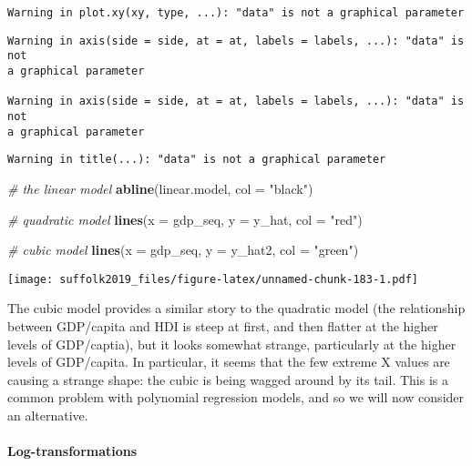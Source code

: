 \documentclass[]{article}
\newenvironment{Shaded}{\begin{snugshade}}{\end{snugshade}}
\newcommand{\CommentTok}[1]{\textcolor[rgb]{0.56,0.35,0.01}{\textit{#1}}}
\newcommand{\DataTypeTok}[1]{\textcolor[rgb]{0.13,0.29,0.53}{#1}}
\newcommand{\KeywordTok}[1]{\textcolor[rgb]{0.13,0.29,0.53}{\textbf{#1}}}
\newcommand{\NormalTok}[1]{#1}
\newcommand{\StringTok}[1]{\textcolor[rgb]{0.31,0.60,0.02}{#1}}
\let\oldparagraph\paragraph
\renewcommand{\paragraph}[1]{\oldparagraph{#1}\mbox{}}
\begin{document}
\begin{verbatim}
Warning in plot.xy(xy, type, ...): "data" is not a graphical parameter
\end{verbatim}

\begin{verbatim}
Warning in axis(side = side, at = at, labels = labels, ...): "data" is not
a graphical parameter

Warning in axis(side = side, at = at, labels = labels, ...): "data" is not
a graphical parameter
\end{verbatim}

\begin{verbatim}
Warning in title(...): "data" is not a graphical parameter
\end{verbatim}

\begin{Shaded}
\begin{Highlighting}[]
\CommentTok{# the linear model}
\KeywordTok{abline}\NormalTok{(linear.model, }\DataTypeTok{col =} \StringTok{"black"}\NormalTok{)}

\CommentTok{# quadratic model}
\KeywordTok{lines}\NormalTok{(}\DataTypeTok{x =}\NormalTok{ gdp_seq, }\DataTypeTok{y =}\NormalTok{ y_hat, }\DataTypeTok{col =} \StringTok{"red"}\NormalTok{)}

\CommentTok{# cubic model}
\KeywordTok{lines}\NormalTok{(}\DataTypeTok{x =}\NormalTok{ gdp_seq, }\DataTypeTok{y =}\NormalTok{ y_hat2, }\DataTypeTok{col =} \StringTok{"green"}\NormalTok{)}
\end{Highlighting}
\end{Shaded}

\texttt{[image: suffolk2019\_files/figure-latex/unnamed-chunk-183-1.pdf]}

The cubic model provides a similar story to the quadratic model (the relationship between GDP/capita and HDI is steep at first, and then flatter at the higher levels of GDP/captia), but it looks somewhat strange, particularly at the higher levels of GDP/capita. In particular, it seems that the few extreme X values are causing a strange shape: the cubic is being wagged around by its tail. This is a common problem with polynomial regression models, and so we will now consider an alternative.

\hypertarget{log-transformations}{%
\paragraph{Log-transformations}\label{log-transformations}}
\end{document}
